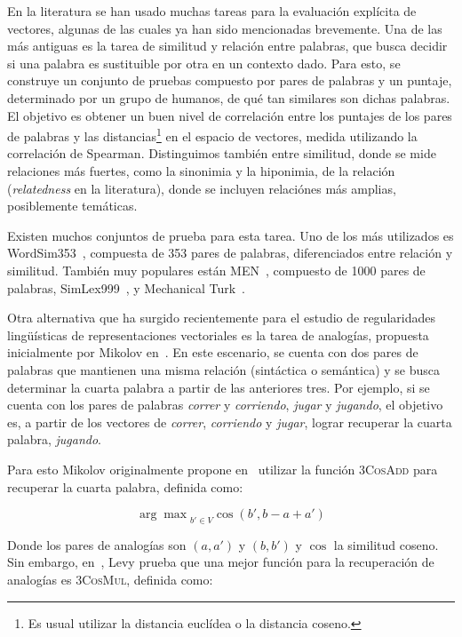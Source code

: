 En la literatura se han usado muchas tareas para la evaluación explícita de vectores, algunas de las
cuales ya han sido mencionadas brevemente. Una de las más antiguas es la tarea de similitud y
relación entre palabras, que busca decidir si una palabra es sustituible por otra en un contexto
dado. Para esto, se construye un conjunto de pruebas compuesto por pares de palabras y un puntaje,
determinado por un grupo de humanos, de qué tan similares son dichas palabras. El objetivo es
obtener un buen nivel de correlación entre los puntajes de los pares de palabras y las
distancias\footnote{Es usual utilizar la distancia euclídea o la distancia coseno.} en el espacio de
vectores, medida utilizando la correlación de Spearman. Distinguimos también entre similitud, donde
se mide relaciones más fuertes, como la sinonimia y la hiponimia, de la relación
(\textit{relatedness} en la literatura), donde se incluyen relaciónes más amplias, posiblemente
temáticas.

Existen muchos conjuntos de prueba para esta tarea. Uno de los más utilizados es
WordSim353~\cite{Finkelstein2002}, compuesta de 353 pares de palabras, diferenciados entre relación
y similitud. También muy populares están MEN~\cite{Bruni2012}, compuesto de 1000 pares de palabras,
SimLex999~\cite{Hill2014}, y Mechanical Turk~\cite{Radinsky2011}.

Otra alternativa que ha surgido recientemente para el estudio de regularidades lingüísticas de
representaciones vectoriales es la tarea de analogías, propuesta inicialmente por Mikolov
en~\cite{Mikolov2013a}. En este escenario, se cuenta con dos pares de palabras que mantienen una
misma relación (sintáctica o semántica) y se busca determinar la cuarta palabra a partir de las
anteriores tres. Por ejemplo, si se cuenta con los pares de palabras \textit{correr} y
\textit{corriendo}, \textit{jugar} y \textit{jugando}, el objetivo es, a partir de los vectores de
\textit{correr}, \textit{corriendo} y \textit{jugar}, lograr recuperar la cuarta palabra,
\textit{jugando}.

Para esto Mikolov originalmente propone en~\cite{Mikolov2013a} utilizar la función \textsc{3CosAdd}
para recuperar la cuarta palabra, definida como:

\[
  {\arg \max}_{b' \in V} \cos(b', b - a + a')
\]

Donde los pares de analogías son $(a, a')$ y $(b, b')$ y $\cos$ la similitud coseno. Sin embargo,
en~\cite{Levy2014b}, Levy prueba que una mejor función para la recuperación de analogías es
\textsc{3CosMul}, definida como:

